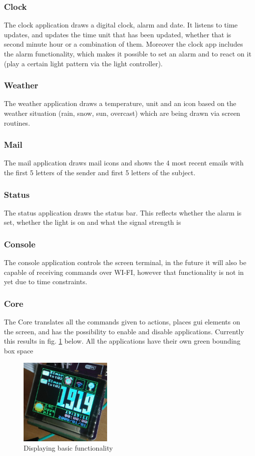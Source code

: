 \subsubsection{Clock}
The clock application draws a digital clock, alarm and date. It listens to time
updates, and updates the time unit that has been updated, whether that is second
minute hour or a combination of them. Moreover the clock app includes the alarm
functionality, which makes it possible to set an alarm and to react on it (play
a certain light pattern via the light controller). 
\subsubsection{Weather}
The weather application draws a temperature, unit and an icon based on the weather situation (rain, snow, sun, overcast) which are being drawn via screen routines. 
\subsubsection{Mail}
The mail application draws mail icons and shows the 4 most recent emails with the first 5 letters of the sender and first 5 letters of the subject.
\subsubsection{Status}
The status application draws the status bar. This reflects whether the alarm is set, whether the light is on and what the signal strength is
\subsubsection{Console}
The console application controls the screen terminal, in the future it will also be capable of receiving commands over WI-FI, however that functionality is not in yet due to time constraints.
\subsubsection{Core}
The Core translates all the commands given to actions, places gui elements on the screen, and has the possibility to enable and disable applications. Currently this results in fig. \ref{fig:clock_weather} below. All the applications have their own green bounding box space
\begin{figure}[H]
	\centering
	\label{fig:clock_weather}
	\includegraphics[width=0.4\textwidth]{./fig/clock_weather.png}
	\caption{Displaying basic functionality}
\end{figure}

